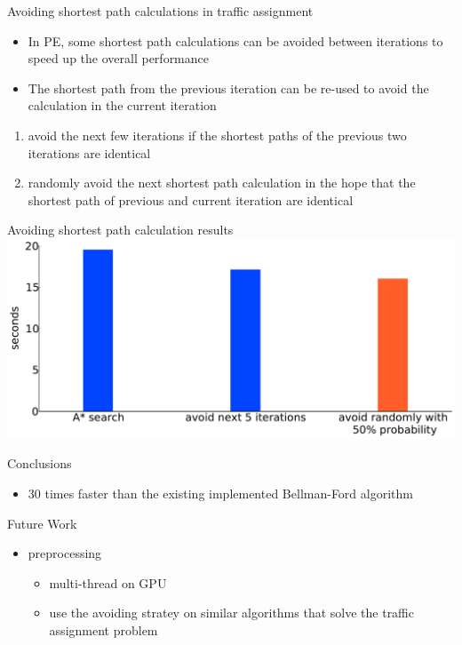 \documentclass{beamer}
\begin{document}
\begin{frame}{Avoiding shortest path calculations in traffic assignment}
    \begin{itemize}
        \item In PE, some shortest path calculations can be avoided between iterations to speed up the overall performance
        \item The shortest path from the previous iteration can be re-used to \alert{avoid} the calculation in the current iteration
    \end{itemize}
            \begin{enumerate}
                \item avoid the next few iterations if the shortest paths of the previous two iterations are identical
                \item randomly avoid the next shortest path calculation in the hope that the shortest path of previous and current iteration are identical
            \end{enumerate}
\end{frame}



\begin{frame}{Avoiding shortest path calculation results}
    \includegraphics[width=\textwidth, keepaspectratio]{img/random_runtime}
\end{frame}

\begin{frame}{Conclusions}
    \begin{itemize}
        \item 30 times faster than the existing implemented Bellman-Ford algorithm
    \end{itemize}
\end{frame}

\begin{frame}{Future Work}
    \begin{itemize}
        \item preprocessing
            \begin{itemize}
                \item multi-thread on GPU
                \item use the avoiding stratey on similar algorithms that solve the traffic assignment problem
            \end{itemize}
    \end{itemize}
\end{frame}
\end{document}
